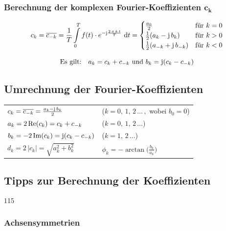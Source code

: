 \subsubsection{Berechnung der komplexen Fourier-Koeffizienten $\bm{c_k}$}

\vspace{-0.2cm}

$$c_k = \overline{c_{-k}} = \frac{1}{T} \int\limits_0^T f(t) \cdot e^{- \mathrm{j} \frac{2 \, \pi \, k \, t}{T}}   \, \mathop{} \! \mathrm{d} t =
\begin{cases}
\frac{a_0}{2}                       & \text{für } k = 0 \\
\frac{1}{2} (a_k - \mathrm{j} \, b_k)        & \text{für } k > 0 \\
\frac{1}{2} (a_{-k} + \mathrm{j} \, b_{-k})  & \text{für } k < 0
\end{cases} $$

$$ \text{Es gilt:} \quad a_k = c_k + c_{-k} \text{ und } b_k = \mathrm{j} (c_k - c_{-k}) $$ 

		
\subsection{Umrechnung der Fourier-Koeffizienten}

\renewcommand{\arraystretch}{1.5}
\begin{tabular}{ll}
    $c_k = \overline{c_{-k}} = \frac{a_k - \mathrm{j} \, b_k }{2}$   & ($k = 0, \, 1, \,  2\, \ldots \, ,$ wobei $b_0 = 0$)  \\
    $a_k = 2 \, \mathrm{Re}(c_k) = c_k + c_{-k}$                        & ($k = 0, \, 1, \,  2\, \ldots$)                       \\
    $b_k = -2 \, \mathrm{Im}(c_k) = \mathrm{j}(c_k - c_{-k})$                & ($k = 1, \,  2\, \ldots$)                             \\
    $d_k = 2 \, |c_k| = \sqrt{a_k^2 + b_k^2}$                   & $\phi_k = - \arctan \Big( \frac{b_k}{a_k} \Big)$
\end{tabular}
\renewcommand{\arraystretch}{1}
		
		
\subsection{Tipps zur Berechnung der Koeffizienten}{115}

\subsubsection{Achsensymmetrien}

